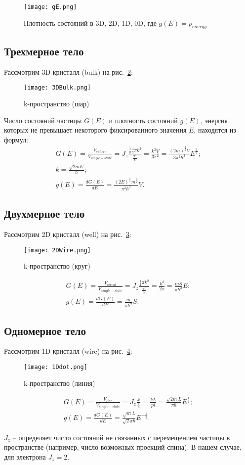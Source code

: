 \begin{figure}[h]
	\centering
	\texttt{[image: gE.png]}
	\caption{Плотность состояний в 3D, 2D, 1D, 0D, где $g(E) = \rho_{energy}$}
	\label{DOS}
\end{figure}

\subsection{Трехмерное тело}
Рассмотрим 3D кристалл (bulk) на рис.~\ref{fig:3DBulk}:
\begin{figure}[h]
	\centering
	\texttt{[image: 3DBulk.png]}
	\caption{k-пространство (шар)}
	\label{fig:3DBulk}
\end{figure}

Число состояний частицы $G(E)$ и плотность состояний $g(E)$, энергия которых не превышает некоторого фиксированного значения $E$, находятся из формул:
\begin{gather*} 
	G(E) = \frac{V_{sphere}}{V_{single-state}} = J_{z}\frac{\frac{1}{8}\frac{4}{3}\pi k^{3}}{\frac{\pi^3}{V}} = \frac{k^{3}V}{3\pi^{2}} = \frac{(2m)^{\frac{3}{2}}V}{3\pi^{2}\hbar^{3}}E^{\frac{3}{2}};\\
	k = \frac{\sqrt{2mE}}{\hbar};\\
	g(E) = \frac{dG(E)}{dE} = \frac{(2E)^{\frac{1}{2}}m^{\frac{3}{2}}}{\pi^{2}\hbar^{3}}V.
\end{gather*}

\subsection{Двухмерное тело}
Рассмотрим 2D кристалл (well) на рис.~\ref{fig:2DWire}:
\begin{figure}[h]
	\centering
	\texttt{[image: 2DWire.png]}
	\caption{k-пространство (круг)}
	\label{fig:2DWire}
\end{figure}

\begin{gather*} 
	G(E) = \frac{V_{circul}}{V_{single-state}} = J_{z}\frac{\frac{1}{4}\pi k^{2}}{\frac{\pi^2}{S}} = \frac{k^{2}}{2\pi} = \frac{mS}{\pi\hbar^{2}}E;\\
	g(E) = \frac{dG(E)}{dE} = \frac{m}{\pi\hbar^{2}}S.
\end{gather*}

\subsection{Одномерное тело}
Рассмотрим 1D кристалл (wire)  на рис.~\ref{fig:1Ddot}:
\begin{figure}[h]
	\centering
	\texttt{[image: 1Ddot.png]}
	\caption{k-пространство (линия)}
	\label{fig:1Ddot}
\end{figure}
\begin{gather*} 
	G(E) = \frac{V_{line}}{V_{single-state}} = J_{z}\frac{k}{\frac{\pi}{L}} = \frac{kL}{pi} = \frac{\sqrt{2m}L}{\pi\hbar}E^{\frac{1}{2}};\\
	g(E) = \frac{dG(E)}{dE} = \frac{\sqrt{m}L}{\sqrt{2}\pi\hbar}E^{-\frac{1}{2}}.
\end{gather*}

$J_{z}$ -- определяет число состояний не связанных с перемещением частицы в пространстве (например, число возможных проекций спина). В нашем случае, для электрона $J_{z}=2$.